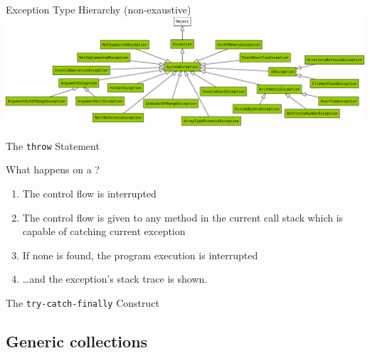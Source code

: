 \documentclass[presentation]{beamer}
\newcommand{\cscat}[1]{$\langle\text{{\itshape#1}}\rangle$}
\begin{document}
\begin{frame}{\dotnet Exception Type Hierarchy (non-exaustive)}
  \includegraphics[width=\linewidth]{img/exception-hierarchy.pdf}
\end{frame}


\begin{frame}{The \texttt{throw} Statement}
\begin{block}{What happens on a ?}
  \begin{enumerate}
    \item The control flow is \alert{interrupted}
    \item The control flow is given to any method in the current \alert{call stack} which is capable of \alert{catching} current exception
    \item If none is found, \alert{the program execution is interrupted}
    \item \ldots and the exception's \alert{stack trace} is shown.
  \end{enumerate}
  \end{block}
\end{frame}

\begin{frame}{The \texttt{try-catch-finally} Construct}
\end{frame}

\subsection{Generic collections}

\newcommand{\kva}[2]{\alert{\lbrack}\cscat{#1}\alert{\rbrack=}\cscat{#2}}
\newcommand{\kvb}[2]{\alert{\{}\cscat{#1}\alert{,}\cscat{#2}\alert{\}}}
\end{document}
